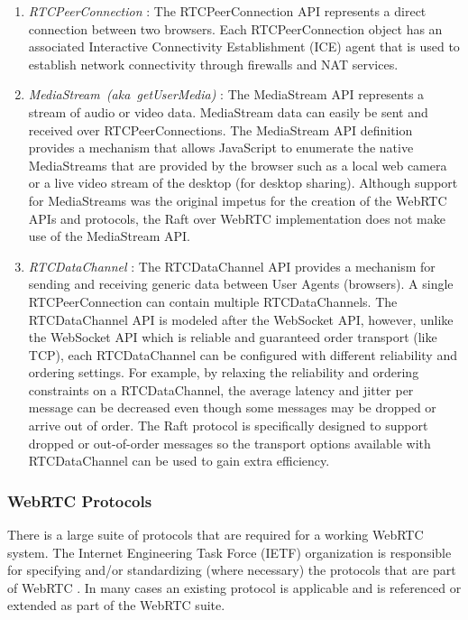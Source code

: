 \documentclass[conference,compsoc]{./IEEEtran/IEEEtran}
\begin{document}
\begin{enumerate}
\item \emph{RTCPeerConnection} \cite{webrtc:rtcpeerconnection:feb2015}:
    The RTCPeerConnection API represents a direct connection between
    two browsers. Each RTCPeerConnection object has an associated
    Interactive Connectivity Establishment (ICE) agent that is used to
    establish network connectivity through firewalls and NAT services.

\item \emph{MediaStream~(aka~getUserMedia)} \cite{webrtc:media-stream:feb2015}:
    The MediaStream API represents a stream of audio or video data.
    MediaStream data can easily be sent and received over
    RTCPeerConnections. The MediaStream API definition provides
    a mechanism that allows JavaScript to enumerate the native
    MediaStreams that are provided by the browser such as a local web
    camera or a live video stream of the desktop (for desktop
    sharing).  Although support for MediaStreams was the original
    impetus for the creation of the WebRTC APIs and protocols, the
    Raft over WebRTC implementation does not make use of the
    MediaStream API.

\item
    \emph{RTCDataChannel} \cite{webrtc:datachannel:feb2015}:
    The RTCDataChannel API provides a mechanism for sending and
    receiving generic data between User Agents (browsers). A single
    RTCPeerConnection can contain multiple RTCDataChannels. The
    RTCDataChannel API is modeled after the WebSocket API, however,
    unlike the WebSocket API which is reliable and guaranteed order
    transport (like TCP), each RTCDataChannel can be configured with
    different reliability and ordering settings. For example, by
    relaxing the reliability and ordering constraints on
    a RTCDataChannel, the average latency and jitter per message can
    be decreased even though some messages may be dropped or arrive
    out of order. The Raft protocol is specifically designed to
    support dropped or out-of-order messages so the transport options
    available with RTCDataChannel can be used to gain extra
    efficiency.
\end{enumerate}


\subsubsection{WebRTC Protocols}

There is a large suite of protocols that are required for a working
WebRTC system. The Internet Engineering Task Force (IETF) organization
is responsible for specifying and/or standardizing (where necessary)
the protocols that are part of WebRTC \cite{draft-rtcweb-overview}
\cite{draft-rtcweb-security-arch} \cite{draft-rtcweb-security}. In
many cases an existing protocol is applicable and is referenced or
extended as part of the WebRTC suite. %
\end{document}
